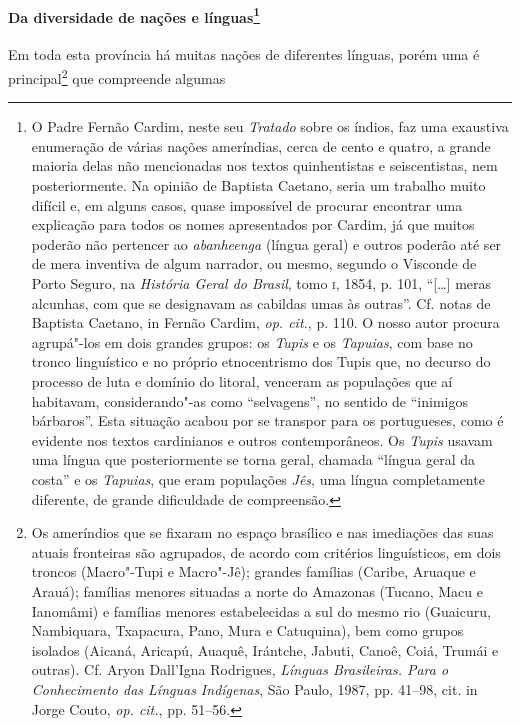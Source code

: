\begin{linenumbers}
\paragraph[Da diversidade de nações e línguas]{Da diversidade de nações e línguas\protect\footnote{ O
Padre Fernão Cardim, neste seu \textit{Tratado} sobre os índios, faz
uma exaustiva enumeração de várias nações ameríndias, cerca de cento e
quatro, a grande maioria delas não mencionadas nos textos quinhentistas
e seiscentistas, nem posteriormente. Na opinião de Baptista Caetano,
seria um trabalho muito difícil e, em alguns casos, quase impossível de
procurar encontrar uma explicação para todos os nomes apresentados por
Cardim, já que muitos poderão não pertencer ao \textit{abanheenga}
(língua geral) e outros poderão até ser de mera inventiva de algum
narrador, ou mesmo, segundo o Visconde de Porto Seguro, na
\textit{História Geral do Brasil}, tomo \textsc{i}, 1854, p. 101, ``[\ldots{}] meras
alcunhas, com que se designavam as cabildas umas às outras''. Cf.
notas de Baptista Caetano, in Fernão Cardim, \textit{op. cit.}, p. 110.
O nosso autor procura agrupá"-los em dois grandes grupos: os
\textit{Tupis} e os \textit{Tapuias}, com base no tronco linguístico e no
próprio etnocentrismo dos Tupis que, no decurso do processo de luta e
domínio do litoral, venceram as populações que aí habitavam,
considerando"-as como ``selvagens'', no sentido de ``inimigos bárbaros''. 
Esta situação acabou por se transpor para os portugueses, como é
evidente nos textos cardinianos e outros contemporâneos. Os
\textit{Tupis} usavam uma língua que posteriormente se torna geral,
chamada ``língua geral da costa'' e os \textit{Tapuias}, que eram
populações \textit{Jês}, uma língua completamente diferente, de grande
dificuldade de compreensão.}} \quad
 Em toda esta província há muitas nações de diferentes línguas, porém
uma é principal\footnote{ Os ameríndios que se fixaram no espaço
brasílico e nas imediações das suas atuais fronteiras são agrupados,
de acordo com critérios linguísticos, em dois troncos (Macro"-Tupi e
Macro"-Jê); grandes famílias (Caribe, Aruaque e Arauá); famílias menores
situadas a norte do Amazonas (Tucano, Macu e Ianomâmi) e famílias
menores estabelecidas a sul do mesmo rio (Guaicuru, Nambiquara,
Txapacura, Pano, Mura e Catuquina), bem como grupos isolados (Aicaná,
Aricapú, Auaquê, Irántche, Jabuti, Canoê, Coiá, Trumái e outras). Cf.
Aryon Dall'Igna Rodrigues, \textit{Línguas Brasileiras. Para o
Conhecimento das Línguas Indígenas}, São Paulo, 1987, pp. 41--98, cit.
in Jorge Couto, \textit{op. cit.}, pp. 51--56.} que compreende algumas

\end{linenumbers}
